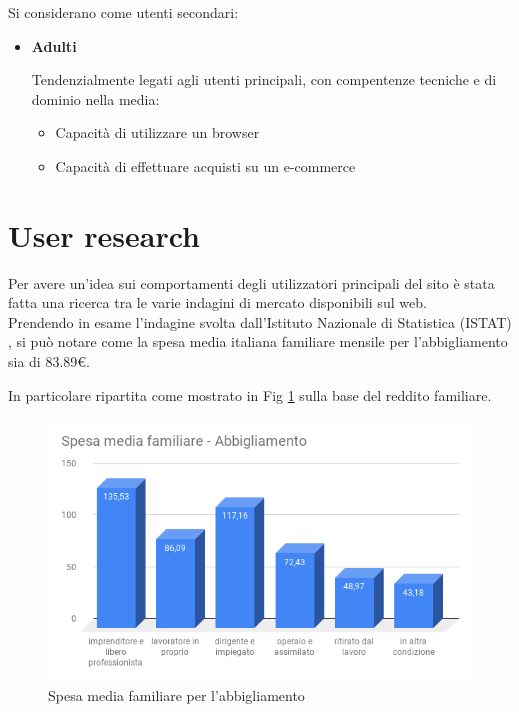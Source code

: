 \documentclass[12pt,italian,]{report}
\providecommand{\tightlist}{%
  \setlength{\itemsep}{0pt}\setlength{\parskip}{0pt}}
\begin{document}
Si considerano come utenti secondari:

\begin{itemize}
\item
  \textbf{Adulti}

  Tendenzialmente legati agli utenti principali, con compentenze
  tecniche e di dominio nella media:

  \begin{itemize}
  \tightlist
  \item
    Capacità di utilizzare un browser
  \item
    Capacità di effettuare acquisti su un e-commerce
  \end{itemize}
\end{itemize}

\hypertarget{user-research}{%
\section{User research}\label{user-research}}

Per avere un'idea sui comportamenti degli utilizzatori principali del
sito è stata fatta una ricerca tra le varie indagini
di mercato disponibili sul web.
\\
Prendendo in esame l'indagine 
svolta dall'Istituto Nazionale di Statistica (ISTAT) \cite{istat}, si può notare come la spesa media italiana familiare mensile per l'abbigliamento sia di 83.89€.

In particolare ripartita come mostrato in Fig \ref{spesa_media_fam} sulla base del reddito familiare.

\begin{figure}[h]
\centering
\includegraphics{img/Spesa_media_familiare_abbigliamento.png}
\caption{Spesa media familiare per l'abbigliamento}
\label{spesa_media_fam}
\end{figure}
\end{document}
